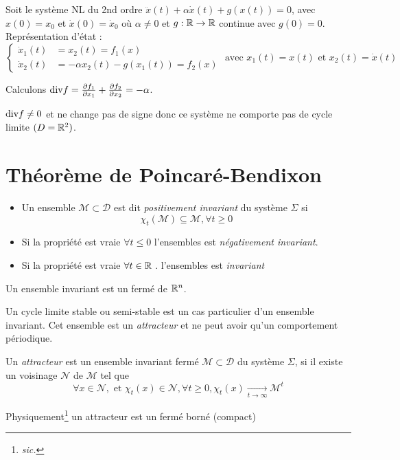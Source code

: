 \documentclass[main.tex]{subfiles}
\begin{document}
\begin{example}
Soit le système NL du 2nd ordre $\ddot{x}(t) + \alpha \dot{x}(t) + g(x(t)) = 0$, avec $x(0) = x_0$ et $\dot{x}(0) = \dot{x}_0$ où $\alpha \neq 0$ et $g:\R \rightarrow \R$ continue avec $g(0)=0$. \\
Représentation d'état :
\[
  \begin{cases}
\dot{x}_1(t) & = x_2(t) = f_1(x)\\
  \dot{x}_2(t) & = - \alpha x_2(t) - g(x_1(t)) = f_2(x)
\end{cases}
\text{ avec } x_1(t) = x(t) \text{ et }x_2(t) = \dot{x}(t) \]

Calculons $\divv f = \derivp[f_1]{x_1} + \derivp[f_2]{x_2} = -\alpha$.

$\divv f \neq 0$ et ne change pas de signe donc ce système ne comporte pas de cycle limite $(D=\R^2)$.
\end{example}
\section{Théorème de Poincaré-Bendixon}
\begin{defin}
  \begin{itemize}
  \item Un ensemble $\mathcal{M}\subset \mathcal{D}$ est dit \emph{positivement
      invariant} du système $\Sigma$ si
  \[\chi_t(\mathcal{M}) \subseteq \mathcal{M} , \forall t \ge 0\]
\item   Si la propriété est vraie $\forall t\le 0 $ l'ensembles est \emph{négativement invariant}.
  \item Si la propriété est vraie $\forall t\in \R$ . l'ensembles est \emph{invariant}
\end{itemize}
\end{defin}
\begin{rem}
  Un ensemble invariant est un fermé de $\R^n$.
\end{rem}

\begin{rem}
  Un cycle limite stable ou semi-stable est un cas particulier d'un ensemble invariant. Cet ensemble est un \emph{attracteur} et  ne peut avoir qu'un comportement périodique.
\end{rem}

\begin{defin}
  Un \emph{attracteur} est un ensemble invariant fermé $\mathcal{M} \subset \mathcal{D}$ du système $\Sigma$, si il existe un voisinage $\mathcal{N}$ de $\mathcal{M}$ tel que
  \[
    \forall x\in \mathcal{N}, \text{ et } \chi_t(x) \in \mathcal{N}, \forall t \ge 0 , \chi_t(x) \xrightarrow[t\to\infty]{} \mathcal{M}^t
  \]
\end{defin}
\begin{rem}
  Physiquement\footnote{\emph{sic.}} un attracteur est un fermé borné (compact)
\end{rem}
\end{document}
